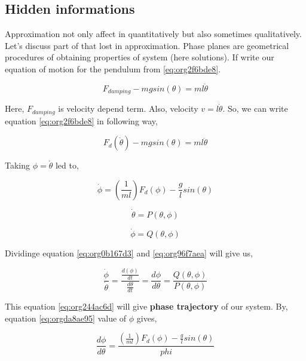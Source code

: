 \documentclass{article}
\begin{document}
\subsection{Hidden informations}
\label{sec:orgbb72165}

Approximation not only affect in quantitatively but also sometimes qualitatively. Let's discuss part of that lost in approximation. Phase planes are geometrical procedures of obtaining properties of system (here solutions). If write our equation of motion for the pendulum from \ref{eq:org2f6bde8}.

\begin{equation*}
\label{eq:org58c086d}
F_{damping}-mgsin(\theta)=ml\ddot{\theta}
\end{equation*}

Here, \(F_{damping}\) is velocity depend term. Also, velocity \(v=l\dot{\theta}\). So, we can write equation \ref{eq:org2f6bde8} in following way,


\begin{equation*}
\label{eq:org2b0adac}
F_{d}(\dot{\theta})-mgsin(\theta)=ml\ddot{\theta}
\end{equation*}

Taking \(\phi=\dot{\theta}\) led to,

\begin{equation}
\label{eq:orgda8ae95}
\dot{\phi}=(\frac{1}{ml})F_{d}(\phi)-\frac{g}{l}sin(\theta)
\end{equation}

\begin{equation}
\label{eq:org96f7aea}
\dot{\theta} = P(\theta,\phi)
\end{equation}

\begin{equation}
\label{eq:org0b167d3}
\dot{\phi} = Q(\theta,\phi)
\end{equation}

Dividinge equation \ref{eq:org0b167d3} and \ref{eq:org96f7aea} will give us,

\begin{equation}
\label{eq:org244ac6d}
\frac{\dot{\phi}}{\dot{\theta}}= \frac{\frac{d(\phi)}{dt}}{\frac{d{\theta}}{dt}} = \frac{d\phi}{d\theta}= \frac{Q(\theta,\phi)}{P(\theta,\phi)}
\end{equation}

This equation \ref{eq:org244ac6d} will give \textbf{phase trajectory} of our system. By, equation \ref{eq:orgda8ae95} value of \(\phi\) gives,

\begin{equation}
\label{eq:orgfab4e08}
\frac{d\phi}{d\theta}=\frac{(\frac{1}{ml})F_{d}(\phi)-\frac{g}{l}sin(\theta)}{phi}
\end{equation}
\end{document}
